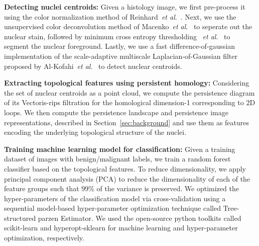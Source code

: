 \documentclass{article}
\newcommand{\etal}{~\textit{et al}.}
\begin{document}
\smallskip
\noindent \textbf{Detecting nuclei centroids:} Given a histology image, we first pre-process it using the color normalization method of Reinhard\etal~\cite{Reinhard2001}. Next, we use the unsupervised color deconvolution method of Macenko\etal~\cite{Macenko2009} to seperate out the nuclear stain, followed by minimum cross entropy thresholding \etal~\cite{Li1998} to segment the nuclear foreground. Lastly, we use a fast difference-of-gaussian implementation of the scale-adaptive multiscale Laplacian-of-Gaussian filter proposed by Al-Kofahi\etal~\cite{Al-Kofahi2010} to detect nuclear centroids.

\smallskip
\noindent \textbf{Extracting topological features using persistent homology:} Considering the set of nuclear centroids as a point cloud, we compute the persistence diagram of its Vectoris-rips filtration for the homological dimension-1 corresponding to 2D loops. We then compute the persistence landscape and persistence image representations, described in Section~\ref{sec:background} and use them as features encoding the underlying topological structure of the nuclei.

\smallskip
\noindent \textbf{Training machine learning model for classification:} Given a training dataset of images with benign/malignant labels, we train a random forest classifier based on the topological features. To reduce dimensionality, we apply principal component analysis (PCA) to reduce the dimensionality of each of the feature groups such that 99\% of the variance is preserved. We optimized the hyper-parameters of the classification model via cross-validation using a sequential model-based hyper-parameter optimization technique called Tree-structured parzen Estimator. We used the open-source python toolkits called scikit-learn and hyperopt-sklearn for machine learning and hyper-parameter optimization, respectively.

\vspace{-0.3cm}
\end{document}
